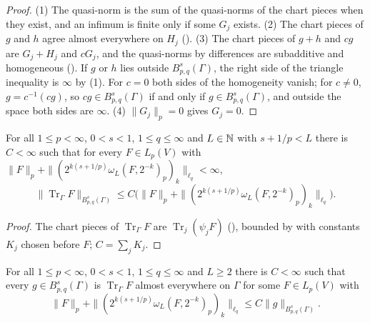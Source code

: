 \begin{proof}
\leanok
(1) The quasi-norm is the sum of the quasi-norms of the chart pieces when they exist, and an
infimum is finite only if some $G_j$ exists. (2) The chart pieces of $g$ and $h$ agree almost
everywhere on $H_j$ (). (3) The chart
pieces of $g + h$ and $c g$ are $G_j + H_j$ and $c G_j$, and the quasi-norms by differences are
subadditive and homogeneous (). If $g$ or $h$ lies outside $B^s_{p,q}(\Gamma)$,
the right side of the triangle inequality is $\infty$ by (1). For $c = 0$ both sides of the
homogeneity vanish; for $c \neq 0$, $g = c^{-1}(c g)$, so $c g \in B^s_{p,q}(\Gamma)$ if and only
if $g \in B^s_{p,q}(\Gamma)$, and outside the space both sides are $\infty$. (4) $\|G_j\|_p = 0$
gives $G_j = 0$.
\end{proof}

\begin{theorem}
\label{thm:boundary-besov-norm-trace}
\leanok
{}
For all $1 \leq p < \infty$, $0 < s < 1$, $1 \leq q \leq \infty$ and $L \in \mathbb{N}$ with
$s + 1/p < L$ there is $C < \infty$ such that for every $F \in L_p(V)$ with
$\|F\|_p + \|(2^{k(s + 1/p)} \omega_L(F, 2^{-k})_p)_k\|_{\ell_q} < \infty$,
\[
  \|\operatorname{Tr}_\Gamma F\|_{B^s_{p,q}(\Gamma)}
    \leq C \bigl(\|F\|_p + \|(2^{k(s + 1/p)} \omega_L(F, 2^{-k})_p)_k\|_{\ell_q}\bigr).
\]
\end{theorem}

\begin{proof}
\leanok
The chart pieces of $\operatorname{Tr}_\Gamma F$ are $\operatorname{Tr}_j(\psi_j F)$
(), bounded by  with
constants $K_j$ chosen before $F$; $C = \sum_j K_j$.
\end{proof}

\begin{theorem}
\label{thm:boundary-besov-norm-extension}
\leanok
{}
For all $1 \leq p < \infty$, $0 < s < 1$, $1 \leq q \leq \infty$ and $L \geq 2$ there is
$C < \infty$ such that every $g \in B^s_{p,q}(\Gamma)$ is $\operatorname{Tr}_\Gamma F$ almost
everywhere on $\Gamma$ for some $F \in L_p(V)$ with
\[
  \|F\|_p + \|(2^{k(s + 1/p)} \omega_L(F, 2^{-k})_p)_k\|_{\ell_q} \leq C \|g\|_{B^s_{p,q}(\Gamma)} .
\]
\end{theorem}

